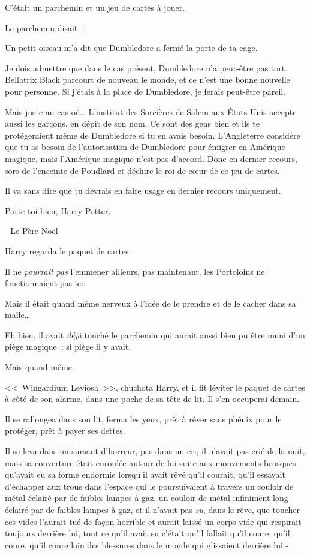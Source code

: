 C'était un parchemin et un jeu de cartes à jouer.

Le parchemin disait~:

\begin{writtenNote}
Un petit oiseau m'a dit que Dumbledore a fermé la porte de ta cage.

Je dois admettre que dans le cas présent, Dumbledore n'a peut-être pas tort. Bellatrix Black parcourt de nouveau le monde, et ce n'est une bonne nouvelle pour personne. Si j'étais à la place de Dumbledore, je ferais peut-être pareil.

Mais juste au cas où… L'institut des Sorcières de Salem aux États-Unis accepte aussi les garçons, en dépit de son nom. Ce sont des gens bien et ils te protégeraient même de Dumbledore si tu en avais besoin. L'Angleterre considère que tu as besoin de l'autorisation de Dumbledore pour émigrer en Amérique magique, mais l'Amérique magique n'est pas d'accord. Donc en dernier recours, sors de l'enceinte de Poudlard et déchire le roi de cœur de ce jeu de cartes.

Il va sans dire que tu devrais en faire usage en dernier recours uniquement.

Porte-toi bien, Harry Potter.

- Le Père Noël
\end{writtenNote}

Harry regarda le paquet de cartes.

Il ne \emph{pourrait pas} l'emmener ailleurs, pas maintenant, les Portoloins ne fonctionnaient pas ici.

Mais il était quand même nerveux à l'idée de le prendre et de le cacher dans sa malle…

Eh bien, il avait \emph{déjà} touché le parchemin qui aurait aussi bien pu être muni d'un piège magique~; si piège il y avait.

Mais quand même.

<<~Wingardium Leviosa~>>, chuchota Harry, et il fit léviter le paquet de cartes à côté de son alarme, dans une poche de sa tête de lit. Il s'en occuperai demain.

Il se rallongea dans son lit, ferma les yeux, prêt à rêver sans phénix pour le protéger, prêt à payer ses dettes.

\later

Il se leva dans un sursaut d'horreur, pas dans un cri, il n'avait pas crié de la nuit, mais sa couverture était enroulée autour de lui suite aux mouvements brusques qu'avait eu sa forme endormie lorsqu'il avait rêvé qu'il courait, qu'il essayait d'échapper aux trous dans l'espace qui le poursuivaient à travers un couloir de métal éclairé par de faibles lampes à gaz, un couloir de métal infiniment long éclairé par de faibles lampes à gaz, et il n'avait pas \emph{su}, dans le rêve, que toucher ces vides l'aurait tué de façon horrible et aurait laissé un corps vide qui respirait toujours derrière lui, tout ce qu'il avait su c'était qu'il fallait qu'il coure, qu'il coure, qu'il coure loin des blessures dans le monde qui glissaient derrière lui -

